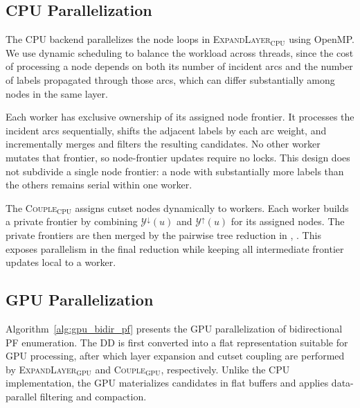 \documentclass[letterpaper]{article}
\begin{document}
\subsection{CPU Parallelization}
\label{sec:cpu_impl}

The CPU backend parallelizes the node loops in \textsc{ExpandLayer}$_{\mathrm{CPU}}$ using OpenMP. We use dynamic scheduling to balance the workload across threads, since the cost of processing a node depends on both its number of incident arcs and the number of labels propagated through those arcs, which can differ substantially among nodes in the same layer.

Each worker has exclusive ownership of its assigned node frontier. It processes the incident arcs sequentially, shifts the adjacent labels by each arc weight, and incrementally merges and filters the resulting candidates. No other worker mutates that frontier, so node-frontier updates require no locks. This design does not subdivide a single node frontier: a node with substantially more labels than the others remains serial within one worker.

The \textsc{Couple}$_{\mathrm{CPU}}$ assigns cutset nodes dynamically to workers. Each worker builds a private frontier by combining $\mathcal{Y}^{\downarrow}(u)$ and $\mathcal{Y}^{\uparrow}(u)$ for its assigned nodes. The private frontiers are then merged by the pairwise tree reduction in , . This exposes parallelism in the final reduction while keeping all intermediate frontier updates local to a worker.

\subsection{GPU Parallelization}
\label{sec:gpu_impl}

Algorithm~\ref{alg:gpu_bidir_pf} presents the GPU parallelization of bidirectional PF enumeration. The DD is first converted into a flat representation suitable for GPU processing, after which layer expansion and cutset coupling are performed by \textsc{ExpandLayer}$_{\mathrm{GPU}}$ and \textsc{Couple}$_{\mathrm{GPU}}$, respectively.
Unlike the CPU implementation, the GPU materializes candidates in flat buffers and applies data-parallel filtering and compaction. 
\end{document}
